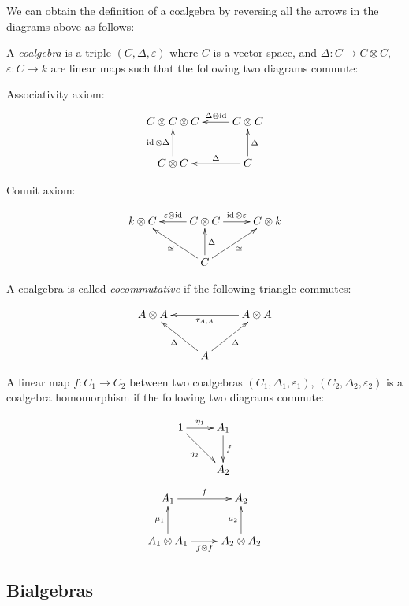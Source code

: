 We can obtain the definition of a coalgebra by reversing all the arrows in the
diagrams above as follows:

\begin{defn}
    A \emph{coalgebra} is a triple $(C, \Delta, \varepsilon)$ where $C$ is a
    vector space, and $\Delta: C \to C \otimes C$, $\varepsilon: C \to k$ are
    linear maps such that the following two diagrams commute:

Associativity axiom:
\begin{equation}
\xymatrix{
C \otimes C \otimes C   & C \otimes C \ar[l]_-{\Delta \otimes \id}\\
 C \otimes C\ar[u]^-{\id \otimes \Delta}  & C \ar[l]_-\Delta \ar[u]_-{\Delta}
}
\end{equation}

Counit axiom:


\begin{equation}
    \xymatrix{
    k \otimes C  & C \otimes C \ar[l]_-{\varepsilon \otimes \id} \ar[r]^-{\id \otimes \varepsilon} & C \otimes k   \\
    & C \ar[u]_-\Delta \ar[lu]^-\simeq \ar[ru]_-{\simeq}&
    }
\end{equation}
\end{defn}
A coalgebra is called \emph{cocommutative} if the following triangle commutes:

\begin{equation}
    \xymatrix{
    A \otimes A   & & A \ar[ll]^-{\tau_{A,A}} \otimes A  \\
    & \ar[lu]^-\Delta A \ar[ru]_-\Delta&
    }
\end{equation}


A linear map $f: C_1 \to C_2$ between two coalgebras $(C_1, \Delta_1,
\varepsilon_1)$, $(C_2, \Delta_2, \varepsilon_2)$ is a coalgebra homomorphism
if the following two diagrams commute: 


\begin{equation}
    \xymatrix{
    1 \ar[r]^-{\eta_1} \ar[rd]_{\eta_2} & A_1 \ar[d]^-f \\
    & A_2
    }
\end{equation}
\begin{equation}
    \xymatrix{
    A_1 \ar[r]^-f & A_2 \\
    A_1 \otimes A_1 \ar[u]^-{\mu_1} \ar[r]_-{f\otimes f} & A_2 \otimes A_2 \ar[u]^-{\mu_2}
    }
\end{equation}



\subsection{Bialgebras}

